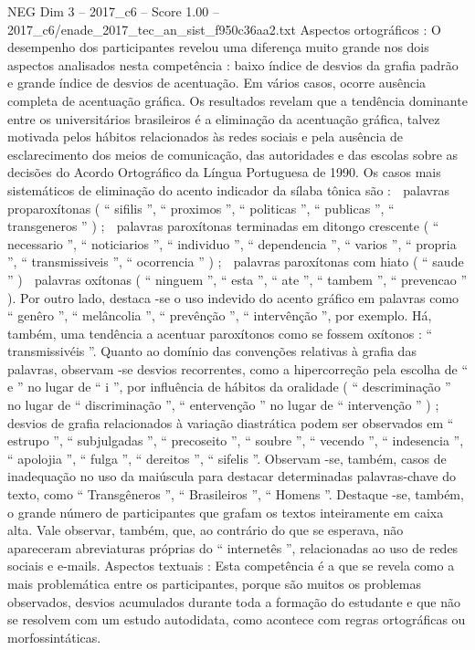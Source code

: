 \begin{textsample}{NEG Dim 3 – 2017\_c6 – Score 1.00 – 2017\_c6/enade\_2017\_tec\_an\_sist\_f950c36aa2.txt}
Aspectos ortográficos : O desempenho dos participantes revelou uma diferença muito grande nos dois aspectos analisados nesta competência : baixo índice de desvios da grafia padrão e grande índice de desvios de acentuação.
Em vários casos, ocorre ausência completa de acentuação gráfica.
Os resultados revelam que a tendência dominante entre os universitários brasileiros é a eliminação da acentuação gráfica, talvez motivada pelos hábitos relacionados às redes sociais e pela ausência de esclarecimento dos meios de comunicação, das autoridades e das escolas sobre as decisões do Acordo Ortográfico da Língua Portuguesa de 1990.
Os casos mais sistemáticos de eliminação do acento indicador da sílaba tônica são :  palavras proparoxítonas ( “ sifilis ”, “ proximos ”, “ politicas ”, “ publicas ”, “ transgeneros ” ) ;  palavras paroxítonas terminadas em ditongo crescente ( “ necessario ”, “ noticiarios ”, “ individuo ”, “ dependencia ”, “ varios ”, “ propria ”, “ transmissiveis ”, “ ocorrencia ” ) ;  palavras paroxítonas com hiato ( “ saude ” )  palavras oxítonas ( “ ninguem ”, “ esta ”, “ ate ”, “ tambem ”, “ prevencao ” ).
Por outro lado, destaca -se o uso indevido do acento gráfico em palavras como “ genêro ”, “ melâncolia ”, “ prevênção ”, “ intervênção ”, por exemplo.
Há, também, uma tendência a acentuar paroxítonos como se fossem oxítonos : “ transmissivéis ”.
Quanto ao domínio das convenções relativas à grafia das palavras, observam -se desvios recorrentes, como a hipercorreção pela escolha de “ e ” no lugar de “ i ”, por influência de hábitos da oralidade ( “ descriminação ” no lugar de “ discriminação ”, “ entervenção ” no lugar de “ intervenção ” ) ; desvios de grafia relacionados à variação diastrática podem ser observados em “ estrupo ”, “ subjulgadas ”, “ precoseito ”, “ soubre ”, “ vecendo ”, “ indesencia ”, “ apolojia ”, “ fulga ”, “ dereitos ”, “ sifelis ”.
Observam -se, também, casos de inadequação no uso da maiúscula para destacar determinadas palavras-chave do texto, como “ Transgêneros ”, “ Brasileiros ”, “ Homens ”.
Destaque -se, também, o grande número de participantes que grafam os textos inteiramente em caixa alta.
Vale observar, também, que, ao contrário do que se esperava, não apareceram abreviaturas próprias do “ internetês ”, relacionadas ao uso de redes sociais e e-mails.
Aspectos textuais : Esta competência é a que se revela como a mais problemática entre os participantes, porque são muitos os problemas observados, desvios acumulados durante toda a formação do estudante e que não se resolvem com um estudo autodidata, como acontece com regras ortográficas ou morfossintáticas.

\end{textsample}

